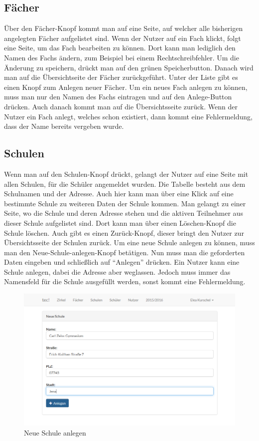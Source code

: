 \subsection{Fächer}
Über den Fächer-Knopf kommt man auf eine Seite, auf welcher alle bisherigen angelegten Fächer aufgelistet sind. Wenn der Nutzer auf ein Fach klickt, folgt eine Seite, um das Fach bearbeiten zu können. Dort kann man lediglich den Namen des Fachs ändern, zum Beispiel bei einem Rechtschreibfehler. Um die Änderung zu speichern, drückt man auf den grünen Speicherbutton. Danach wird man auf die Übersichtseite der Fächer zurückgeführt. Unter der Liste gibt es einen Knopf zum Anlegen neuer Fächer. Um ein neues Fach anlegen zu können, muss man nur den Namen des Fachs eintragen und auf den Anlege-Button drücken. Auch danach kommt man auf die Übersichtsseite zurück. Wenn der Nutzer ein Fach anlegt, welches schon existiert, dann kommt eine Fehlermeldung, dass der Name bereits vergeben wurde.

\subsection{Schulen}
Wenn man auf den Schulen-Knopf drückt, gelangt der Nutzer auf eine Seite mit allen Schulen, für die Schüler angemeldet wurden. Die Tabelle besteht aus dem Schulnamen und der Adresse. Auch hier kann man über eine Klick auf eine bestimmte Schule zu weiteren Daten der Schule kommen. Man gelangt zu einer Seite, wo die Schule und deren Adresse stehen und die aktiven Teilnehmer aus dieser Schule aufgelistet sind. Dort kann man über einen Löschen-Knopf die Schule löschen. Auch gibt es einen Zurück-Knopf, dieser bringt den Nutzer zur Übersichtsseite der Schulen zurück. Um eine neue Schule anlegen zu können, muss man den Neue-Schule-anlegen-Knopf betätigen. Nun muss man die geforderten Daten eingeben und schließlich auf "`Anlegen"' drücken. Ein Nutzer kann eine Schule anlegen, dabei die Adresse aber weglassen. Jedoch muss immer das Namensfeld für die Schule ausgefüllt werden, sonst kommt eine Fehlermeldung.

\begin{figure}[ht]
	\centering
	\includegraphics[scale=.45]{bilder/Neue_Schule_anlegen.png}
	\caption{Neue Schule anlegen}
\end{figure}

